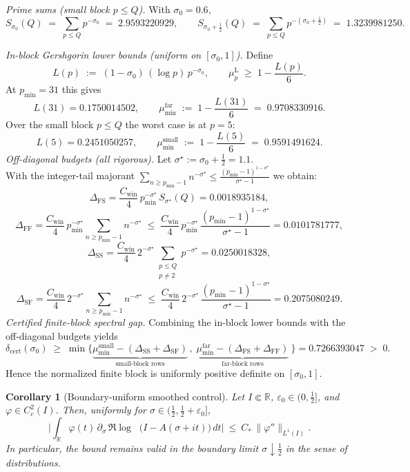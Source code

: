\documentclass[11pt]{article}
\newtheorem{corollary}[theorem]{Corollary}
\theoremstyle{definition}
\theoremstyle{remark}
\theoremstyle{definition}
\newcommand{\R}{\mathbb{R}}
\DeclareMathOperator{\dettwo}{det_2}
\begin{document}
\noindent\emph{Prime sums (small block \(p\le Q\)).} With \(\sigma_0=0.6\),
\[
S_{\sigma_0}(Q)\;=\;\sum_{p\le Q} p^{-\sigma_0}\;=\;2.9593220929,\qquad
S_{\sigma_0+\tfrac12}(Q)\;=\;\sum_{p\le Q} p^{-(\sigma_0+\tfrac12)}\;=\;1.3239981250.
\]

\noindent\emph{In-block Gershgorin lower bounds (uniform on \([\sigma_0,1]\)).}
Define
\[
L(p)\;:=\;(1-\sigma_0)\,(\log p)\,p^{-\sigma_0},\qquad 
\mu_p^{\mathrm L}\;\ge\;1-\frac{L(p)}{6}.
\]
At \(p_{\min}=31\) this gives
\[
L(31)=0.1750014502,\qquad 
\mu_{\min}^{\mathrm{far}}\;:=\;1-\frac{L(31)}{6}\;=\;0.9708330916.
\]
Over the small block \(p\le Q\) the worst case is at \(p=5\):
\[
L(5)=0.2451050257,\qquad 
\mu_{\min}^{\mathrm{small}}\;:=\;1-\frac{L(5)}{6}\;=\;0.9591491624.
\]
\noindent\emph{Off-diagonal budgets (all rigorous).}
Let \(\sigma^\star:=\sigma_0+\tfrac12=1.1\).\\
With the integer-tail majorant \(\displaystyle \sum_{n\ge p_{\min}-1} n^{-\sigma^\star}\le
\frac{(p_{\min}-1)^{1-\sigma^\star}}{\sigma^\star-1}\)
we obtain:
\[
\Delta_{\mathrm{FS}}
=\frac{C_{\mathrm{win}}}{4}\,p_{\min}^{-\sigma^\star}\,S_{\sigma^\star}(Q)
=0.0018935184,
\]
\[
\Delta_{\mathrm{FF}}
=\frac{C_{\mathrm{win}}}{4}\,p_{\min}^{-\sigma^\star}\!
\sum_{n\ge p_{\min}-1}\! n^{-\sigma^\star}
\;\le\;\frac{C_{\mathrm{win}}}{4}\,p_{\min}^{-\sigma^\star}\,
\frac{(p_{\min}-1)^{1-\sigma^\star}}{\sigma^\star-1}
=0.0101781777,
\]
\[
\Delta_{\mathrm{SS}}
=\frac{C_{\mathrm{win}}}{4}\,2^{-\sigma^\star}
\!\sum_{\substack{p\le Q\\ p\neq 2}}\! p^{-\sigma^\star}
=0.0250018328,
\]
\[
\Delta_{\mathrm{SF}}
=\frac{C_{\mathrm{win}}}{4}\,2^{-\sigma^\star}\!
\sum_{n\ge p_{\min}-1}\! n^{-\sigma^\star}
\;\le\;\frac{C_{\mathrm{win}}}{4}\,2^{-\sigma^\star}\,
\frac{(p_{\min}-1)^{1-\sigma^\star}}{\sigma^\star-1}
=0.2075080249.
\]
\noindent\emph{Certified finite-block spectral gap.}
Combining the in-block lower bounds with the off-diagonal budgets yields
\[
\delta_{\mathrm{cert}}(\sigma_0)\;\ge\;
\min\Big\{
\underbrace{\mu_{\min}^{\mathrm{small}}-(\Delta_{\mathrm{SS}}+\Delta_{\mathrm{SF}})}_{\text{small-block rows}}\,,\;
\underbrace{\mu_{\min}^{\mathrm{far}}-(\Delta_{\mathrm{FS}}+\Delta_{\mathrm{FF}})}_{\text{far-block rows}}\
\Big\}
=0.7266393047\;>\;0.
\]
Hence the normalized finite block is uniformly positive definite on \([\sigma_0,1]\).
\fi
\begin{corollary}[Boundary-uniform smoothed control]\label{cor:det2-boundary}
Let $I\Subset\R$, $\varepsilon_0\in(0,\tfrac12]$, and $\varphi\in C_c^2(I)$. Then, uniformly for $\sigma\in(\tfrac12,\tfrac12+\varepsilon_0]$,
\[
  \Big|\int_{\R} \varphi(t)\,\partial_\sigma\,\Re\log\dettwo\big(I-A(\sigma+it)\big)\,dt\Big|\ \le\ C_*\,\|\varphi''\|_{L^1(I)}.
\]
In particular, the bound remains valid in the boundary limit $\sigma\downarrow \tfrac12$ in the sense of distributions.
\end{corollary}
\end{document}
